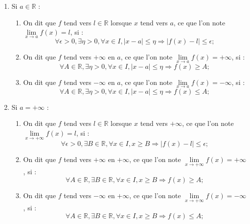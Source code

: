 \documentclass{article}
\begin{document}
		\begin{enumerate}
			\item Si $a \in \mathbb{R}$ :
			\begin{enumerate}
				\item On dit que $f$ tend vers $l \in \mathbb{R}$ lorsque $x$ tend vers $a$, ce que l’on note $\lim\limits_{x \to a} f(x) = l$, si :
				\[
				\forall \epsilon > 0, \exists \eta > 0, \forall x \in I, |x - a| \leq \eta \Rightarrow |f(x) - l| \leq \epsilon;
				\]
				\item On dit que $f$ tend vers $+\infty$ en $a$, ce que l’on note $\lim\limits_{x \to a} f(x) = +\infty$, si :
				\[
				\forall A \in \mathbb{R}, \exists \eta > 0, \forall x \in I, |x - a| \leq \eta \Rightarrow f(x) \geq A;
				\]
				\item On dit que $f$ tend vers $-\infty$ en $a$, ce que l’on note $\lim\limits_{x \to a} f(x) = -\infty$, si :
				\[
				\forall A \in \mathbb{R}, \exists \eta > 0, \forall x \in I, |x - a| \leq \eta \Rightarrow f(x) \leq A;
				\]
			\end{enumerate}
			
			\item Si $a = +\infty$ :
			\begin{enumerate}
				\item On dit que $f$ tend vers $l \in \mathbb{R}$ lorsque $x$ tend vers $+\infty$, ce que l’on note $\lim\limits_{x \to +\infty} f(x) = l$, si :
				\[
				\forall \epsilon > 0, \exists B \in \mathbb{R}, \forall x \in I, x \geq B \Rightarrow |f(x) - l| \leq \epsilon;
				\]
				\item On dit que $f$ tend vers $+\infty$ en $+\infty$, ce que l’on note $\lim\limits_{x \to +\infty} f(x) = +\infty$, si :
				\[
				\forall A \in \mathbb{R}, \exists B \in \mathbb{R}, \forall x \in I, x \geq B \Rightarrow f(x) \geq A;
				\]
				\item On dit que $f$ tend vers $-\infty$ en $+\infty$, ce que l’on note $\lim\limits_{x \to +\infty} f(x) = -\infty$, si :
				\[
				\forall A \in \mathbb{R}, \exists B \in \mathbb{R}, \forall x \in I, x \geq B \Rightarrow f(x) \leq A;
				\]
			\end{enumerate}
			

\end{enumerate}
\end{document}
